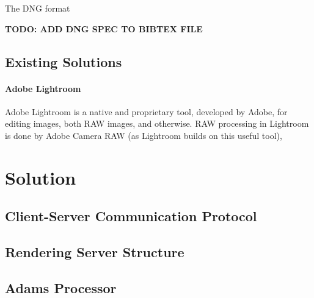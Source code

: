 \documentclass[12pt,a4paper]{article}
\begin{document}
The DNG format 

\textbf{TODO: ADD DNG SPEC TO BIBTEX FILE}
\subsection{Existing Solutions}

    \paragraph{Adobe Lightroom}
    Adobe Lightroom is a native and proprietary tool, developed by Adobe, for editing images, both RAW images, and otherwise.
    RAW processing in Lightroom is done by Adobe Camera RAW (as Lightroom builds on this useful tool), 

\subsection{}


\section{Solution}



\subsection{Client-Server Communication Protocol}


\subsection{Rendering Server Structure}

\subsection{Adams Processor}
\end{document}
